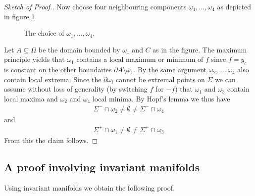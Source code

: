 \begin{proof}[Sketch of Proof.]
  Now choose four neighbouring components $\omega_1,\dots,\omega_4$ as depicted in figure \ref{fi:n2:levelSets:neighbouringComponents}
  \begin{figure}
    \centering
    \caption{The choice of $\omega_1,\dots,\omega_4$.}
    \label{fi:n2:levelSets:neighbouringComponents}
  \end{figure}
  Let $A\subseteq\Omega$ be the domain bounded
  by $\omega_1$ and $C$ as in the figure. The maximum principle yields that $\omega_1$ contains a local maximum or minimum of $f$ since
  $f=y_c$ is constant on the other boundaries $\partial A\setminus\omega_1$.
  By the same argument $\omega_2,\dots,\omega_4$ also contain local extrema. 
  Since the $\partial\omega_i$ cannot be extremal points on $\Sigma$
  we can assume without loss of generality (by switching $f$ for $-f$) that $\omega_1$ and $\omega_3$ contain local maxima and $\omega_2 $ and $\omega_4$ local
  minima. By Hopf's lemma we thus have
  \begin{align*}
    \Sigma^-\cap\omega_2\neq\emptyset\neq\Sigma^-\cap\omega_4
  \end{align*}
  and 
  \begin{align*}
    \Sigma^+\cap\omega_1\neq\emptyset\neq\Sigma^+\cap\omega_3
  \end{align*}
  From this the claim follows.
\end{proof}

\subsection{A proof involving invariant manifolds}

Using invariant manifolds we obtain the following proof.

